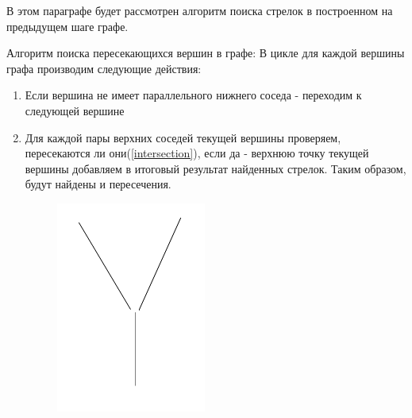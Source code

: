 В этом параграфе будет рассмотрен алгоритм поиска стрелок в построенном на предыдущем шаге графе. 

Алгоритм поиска пересекающихся вершин в графе: \newline
В цикле для каждой вершины графа производим следующие действия:
\begin{enumerate}
	\item Если вершина не имеет параллельного нижнего соседа - переходим к следующей вершине
	\item Для каждой пары верхних соседей текущей вершины проверяем, пересекаются ли они(\ref{intersection}), если да - верхнюю точку текущей вершины добавляем в итоговый результат найденных стрелок. Таким образом, будут найдены  и  пересечения.
	\begin{figure}[!h]
		\centering
		\begin{minipage}{0.45\textwidth}
			\centering
			\includegraphics[width=0.7\linewidth]{pictures/Y_cross}
			\caption[Y]{}
			\label{fig:ycross}
		\end{minipage}
		\begin{minipage}{0.45\textwidth}
			\centering

\end{minipage}
\end{figure}
\end{enumerate}
